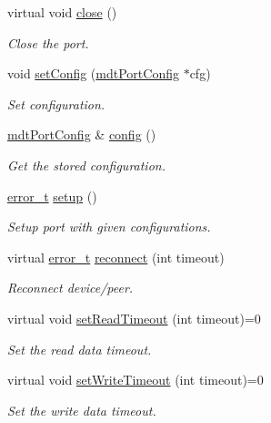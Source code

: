 \begin{DoxyCompactItemize}
virtual void \hyperlink{classmdt_abstract_port_a1ace1a2bd1a04f16952980e247b04800}{close} ()
\begin{DoxyCompactList}\small\item\em Close the port. \end{DoxyCompactList}\item 
void \hyperlink{classmdt_abstract_port_a48bdc0a8057c3b119763643098cf798f}{set\-Config} (\hyperlink{classmdt_port_config}{mdt\-Port\-Config} $\ast$cfg)
\begin{DoxyCompactList}\small\item\em Set configuration. \end{DoxyCompactList}\item 
\hyperlink{classmdt_port_config}{mdt\-Port\-Config} \& \hyperlink{classmdt_abstract_port_a3d105c90696f7c40f29c24fe9b6e4481}{config} ()
\begin{DoxyCompactList}\small\item\em Get the stored configuration. \end{DoxyCompactList}\item 
\hyperlink{classmdt_abstract_port_ad4121bb930c95887e77f8bafa065a85e}{error\-\_\-t} \hyperlink{classmdt_abstract_port_abc9f1154ac71c4e31ac3e7a3ff4c5182}{setup} ()
\begin{DoxyCompactList}\small\item\em Setup port with given configurations. \end{DoxyCompactList}\item 
virtual \hyperlink{classmdt_abstract_port_ad4121bb930c95887e77f8bafa065a85e}{error\-\_\-t} \hyperlink{classmdt_abstract_port_aec74b2db1a629d98a95d8f042ea96653}{reconnect} (int timeout)
\begin{DoxyCompactList}\small\item\em Reconnect device/peer. \end{DoxyCompactList}\item 
virtual void \hyperlink{classmdt_abstract_port_a6589b04467e0073d18ba872201bdcd84}{set\-Read\-Timeout} (int timeout)=0
\begin{DoxyCompactList}\small\item\em Set the read data timeout. \end{DoxyCompactList}\item 
virtual void \hyperlink{classmdt_abstract_port_a12eb422d52ebb09a650f8497b258c2e7}{set\-Write\-Timeout} (int timeout)=0
\begin{DoxyCompactList}\small\item\em Set the write data timeout. \end{DoxyCompactList}\item 

\end{DoxyCompactItemize}
